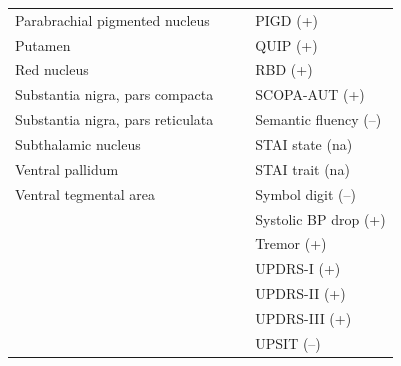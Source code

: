 \documentclass[12pt,aps,pra,reprint,showkeys]{revtex4-1}
\begin{document}
\begin{table}[p]
\begin{center}
\begin{tabular}{l l l l}
          Parabrachial pigmented nucleus &                           &                             &                      PIGD (+) \\
                                 Putamen &                           &                             &                      QUIP (+) \\
                             Red nucleus &                           &                             &                       RBD (+) \\
         Substantia nigra, pars compacta &                           &                             &                 SCOPA-AUT (+) \\
       Substantia nigra, pars reticulata &                           &                             &         Semantic fluency (--) \\
                     Subthalamic nucleus &                           &                             &               STAI state (na) \\
                        Ventral pallidum &                           &                             &               STAI trait (na) \\
                  Ventral tegmental area &                           &                             &             Symbol digit (--) \\
                                         &                           &                             &          Systolic BP drop (+) \\
                                         &                           &                             &                    Tremor (+) \\
                                         &                           &                             &                   UPDRS-I (+) \\
                                         &                           &                             &                  UPDRS-II (+) \\
                                         &                           &                             &                 UPDRS-III (+) \\
                                         &                           &                             &                    UPSIT (--) \\ \bottomrule
      \end{tabular}
    \end{center}
\end{table}
\end{document}
